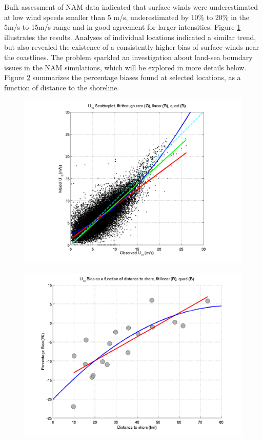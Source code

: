 Bulk assessment of NAM data indicated that surface winds were underestimated at
low wind speeds smaller than 5 m/s, underestimated by 10\% to 20\% in the 5m/s
to 15m/s range and in good agreement for larger intensities. Figure
\ref{fig:nambulk} illustrates the results. Analyses of individual locations
indicated a similar trend, but also revealed the existence of a consistently
higher bias of surface winds near the coastlines. The problem sparkled an
investigation about land-sea boundary issues in the NAM simulations, which will
be explored in more details below. Figure \ref{fig:namshorebias} summarizes the
percentage biases found at selected locations, as a function of distance to the
shoreline.

\begin{figure}[h!]
 \centering
 \includegraphics{./figures/fig_nambulk.png}
 \label{fig:nambulk}
\end{figure}

\begin{figure}[h!]
 \centering
 \includegraphics{./figures/fig_namshorebias.png}
 \label{fig:namshorebias}
\end{figure}

